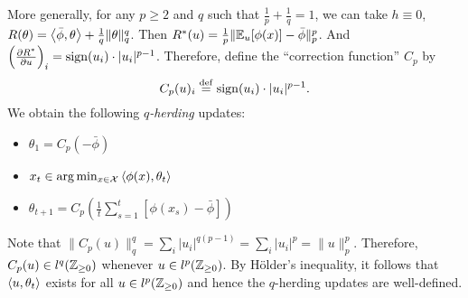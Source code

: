 \documentclass[paper.tex]{subfiles}
\begin{document}
More generally, for any 
$p \geq 2$ and $q$ such that $\frac{1}{p} + \frac{1}{q} = 1$, we can take 
$h \equiv 0$, $R(\theta) = \left\langle \bar{\phi}, \theta \right\rangle + \frac{1}{q}\|\theta\|_q^q$. 
Then $R^*(u) = \frac{1}{p}\|\mathbb{E}_{u}[\phi(x)]-\bar{\phi}\|_p^p$. And 
$\left(\frac{\partial R^*}{\partial u}\right)_i = \operatorname{sign}(u_i) \cdot |u_i|^{p-1}$. 
Therefore, define the ``correction function'' $C_p$ by
\begin{equation}
C_p(u)_i \stackrel{\mathrm{def}}{=} \operatorname{sign}(u_i) \cdot |u_i|^{p-1}.
\end{equation}
We obtain the following \emph{$q$-herding} updates:
\begin{itemize}
\item $\theta_{1} = C_p(-\bar{\phi})$
\item $x_{t} \in \arg\min_{x \in \mathcal{X}} \left\langle \phi(x), \theta_t \right\rangle$
\item $\theta_{t+1} = C_p\left(\frac{1}{t} \sum_{s=1}^t [\phi(x_s)-\bar{\phi}]\right)$
\end{itemize}
Note that $\|C_p(u)\|_q^q = \sum_{i} |u_i|^{q(p-1)} = \sum_{i} |u_i|^p = \|u\|_p^p$. 
Therefore, $C_p(u) \in l^q(\mathbb{Z}_{\geq 0})$ whenever $u \in l^p(\mathbb{Z}_{\geq 0})$. By 
H\"{o}lder's inequality, it follows that $\left\langle u, \theta_t \right\rangle$ exists for all 
$u \in l^p(\mathbb{Z}_{\geq 0})$ and hence the $q$-herding updates are well-defined.

\end{document}
